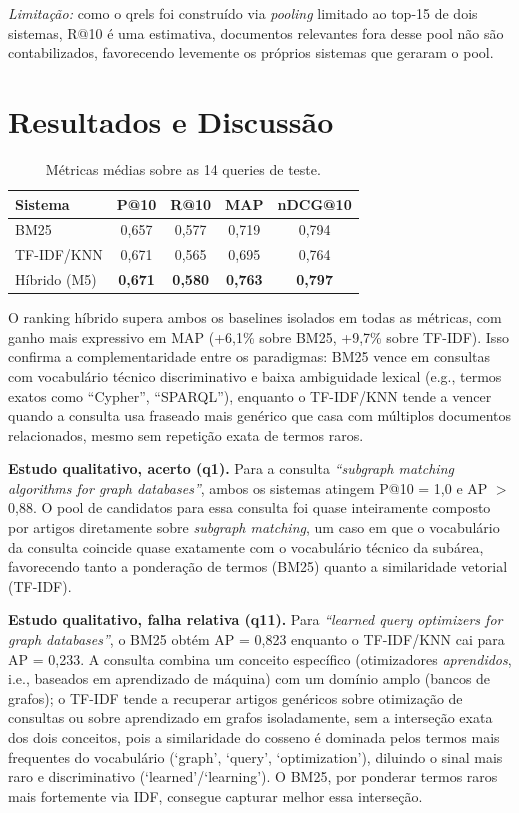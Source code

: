 \documentclass[12pt]{article}
\begin{document}
\textit{Limitação:} como o qrels foi construído via \textit{pooling}
limitado ao top-15 de dois sistemas, R@10 é uma estimativa, documentos
relevantes fora desse pool não são contabilizados, favorecendo levemente os
próprios sistemas que geraram o pool.

\section{Resultados e Discussão}
\label{sec:discussao}

\begin{table}[h]
\centering
\caption{Métricas médias sobre as 14 queries de teste.}
\label{tab:resultados}
\begin{tabular}{lcccc}
\toprule
Sistema & P@10 & R@10 & MAP & nDCG@10 \\
\midrule
BM25            & 0,657 & 0,577 & 0,719 & 0,794 \\
TF-IDF/KNN      & 0,671 & 0,565 & 0,695 & 0,764 \\
Híbrido (M5)    & \textbf{0,671} & \textbf{0,580} & \textbf{0,763} & \textbf{0,797} \\
\bottomrule
\end{tabular}
\end{table}

O ranking híbrido supera ambos os baselines isolados em todas as métricas,
com ganho mais expressivo em MAP (+6,1\% sobre BM25, +9,7\% sobre TF-IDF).
Isso confirma a complementaridade entre os paradigmas: BM25 vence em
consultas com vocabulário técnico discriminativo e baixa ambiguidade
lexical (e.g., termos exatos como ``Cypher'', ``SPARQL''), enquanto o
TF-IDF/KNN tende a vencer quando a consulta usa fraseado mais genérico que
casa com múltiplos documentos relacionados, mesmo sem repetição exata de
termos raros.

\textbf{Estudo qualitativo, acerto (q1).} Para a consulta
\textit{``subgraph matching algorithms for graph databases''}, ambos os
sistemas atingem P@10 = 1,0 e AP $>$ 0,88. O pool de candidatos para essa
consulta foi quase inteiramente composto por artigos diretamente sobre
\textit{subgraph matching}, um caso em que o vocabulário da consulta
coincide quase exatamente com o vocabulário técnico da
subárea, favorecendo tanto a ponderação de termos (BM25) quanto a
similaridade vetorial (TF-IDF).

\textbf{Estudo qualitativo, falha relativa (q11).} Para
\textit{``learned query optimizers for graph databases''}, o BM25 obtém
AP = 0,823 enquanto o TF-IDF/KNN cai para AP = 0,233. A consulta combina um
conceito específico (otimizadores \emph{aprendidos}, i.e., baseados em
aprendizado de máquina) com um domínio amplo (bancos de grafos); o TF-IDF
tende a recuperar artigos genéricos sobre otimização de consultas ou sobre
aprendizado em grafos isoladamente, sem a interseção exata dos dois
conceitos, pois a similaridade do cosseno é dominada pelos termos mais
frequentes do vocabulário (`graph', `query', `optimization'), diluindo o
sinal mais raro e discriminativo (`learned'/`learning'). O BM25, por
ponderar termos raros mais fortemente via IDF, consegue capturar melhor essa
interseção.
\end{document}
